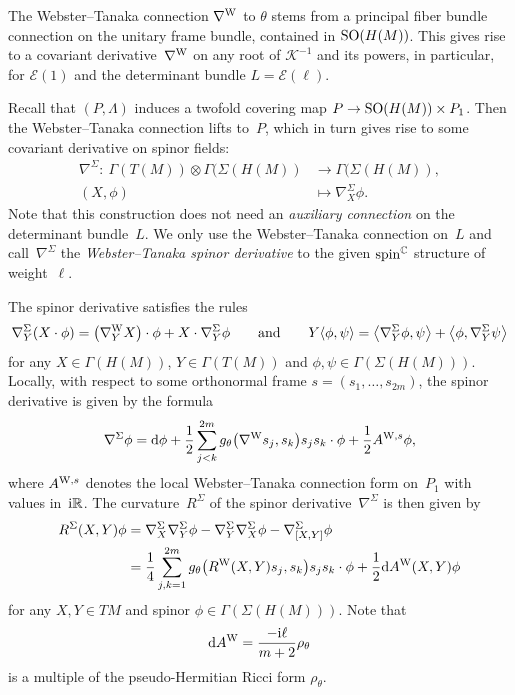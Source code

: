 \documentclass[10pt,a4paper]{amsart}
\numberwithin{equation}{section}
\newcommand{\RR}{\mathbb{R}}
\newcommand{\CC}{\mathbb{C}}
\begin{document}
The Webster--Tanaka connection $\nabla^{\rm W}$ to $\theta$ stems from a principal fiber bundle
connection on the unitary frame bundle, contained in ${\rm SO}(H(M))$. This gives rise to a covariant derivative~$\nabla^{\rm W}$
on any root of $\mathcal{K}^{-1}$ and its powers,
in particular, for $\mathcal{E}(1)$ and the determinant bundle $L=\mathcal{E}(\ell)$.

Recall that $(P,\Lambda)$ induces a twofold covering map $P\to {\rm SO}(H(M))\times P_1$.
Then the Webster--Tanaka connection lifts to~$P$, which in turn gives rise to some covariant derivative on spinor
fields:
\begin{align*}
\nabla^\Sigma \colon \ \Gamma(T(M)) \otimes \Gamma(\Sigma(H(M))&\to \Gamma(\Sigma(H(M)),\\
 (X,\phi) &\mapsto \nabla^\Sigma_X\phi.
\end{align*}
Note that this construction does not need an {\em auxiliary connection} on the determinant bundle~$L$.
We only use the Webster--Tanaka connection on~$L$ and call~$\nabla^\Sigma$
the {\em Webster--Tanaka spinor derivative} to the given ${\rm spin}^\CC$ structure of weight~$\ell$.

The spinor derivative satisfies the rules
\begin{gather*}
\nabla^\Sigma_Y (X\cdot \phi) = \big(\nabla^{\rm W}_YX\big)\cdot \phi + X\cdot \nabla^\Sigma_Y\phi\qquad \mbox{and} \qquad
Y\langle \phi,\psi\rangle = \big\langle \nabla^\Sigma_Y \phi,\psi\big\rangle + \big\langle \phi,\nabla_Y^\Sigma \psi\big\rangle
\end{gather*}
for any $X\in\Gamma(H(M))$, $Y\in\Gamma(T(M))$ and $\phi,\psi\in\Gamma(\Sigma(H(M)))$.
Locally, with respect to some orthonormal frame $s=(s_1,\dots,s_{2m})$, the spinor derivative is given by the formula
\[
\nabla^\Sigma\phi = {\rm d}\phi + \frac{1}{2}\sum_{j<k}^{2m}g_\theta\big(\nabla^{\rm W}s_j,s_k\big)s_js_k\cdot \phi + \frac{1}{2}A^{{\rm W},s} \phi,
\]
where $A^{{\rm W},s}$ denotes the local Webster--Tanaka connection form on~$P_1$ with values in~${\rm i}\RR$.
The curvature~$R^\Sigma$ of the spinor derivative~$\nabla^\Sigma$ is then given by
\begin{align*}
R^\Sigma(X,Y)\phi &= \nabla^\Sigma_X\nabla^\Sigma_Y\phi- \nabla^\Sigma_Y\nabla^\Sigma_X\phi-\nabla^\Sigma_{[X,Y]}\phi\\
&= \frac{1}{4}\sum_{j,k=1}^{2m} g_\theta\big(R^{\rm W}(X,Y)s_j,s_k\big)s_js_k\cdot \phi + \frac{1}{2}{\rm d}A^{\rm W}(X,Y)\phi
\end{align*}
for any $X,Y\in TM$ and spinor $\phi\in\Gamma(\Sigma(H(M)))$. Note that
\begin{equation}\label{curline}
{\rm d}A^{\rm W} = \frac{-{\rm i}\ell}{m+2}\rho_\theta
\end{equation}
is a multiple of the pseudo-Hermitian Ricci form $\rho_\theta$.
\end{document}
